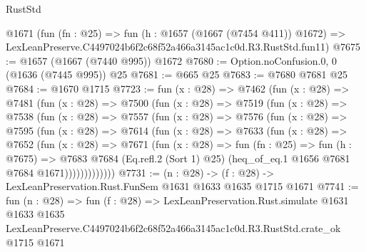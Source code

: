 \begin{lexlean}{RustStd}
\begin{coremodule}
    @1671
    (fun (fn : @25) =>
    fun (h : @1657 (@1667 (@7454 @411)) @1672) =>
    LexLeanPreserve.C4497024b6f2c68f52a466a3145ac1c0d.R3.RustStd.fun11)
@7675 := @1657 (@1667 (@7440 @995)) @1672
@7680 := Option.noConfusion.{0, 0} (@1636 (@7445 @995)) @25
@7681 := @665 @25
@7683 := @7680 @7681 @25
@7684 := @1670 @1715
@7723 := fun (x : @28) =>
  @7462
    (fun (x : @28) =>
    @7481
      (fun (x : @28) =>
      @7500
        (fun (x : @28) =>
        @7519
          (fun (x : @28) =>
          @7538
            (fun (x : @28) =>
            @7557
              (fun (x : @28) =>
              @7576
                (fun (x : @28) =>
                @7595
                  (fun (x : @28) =>
                  @7614
                    (fun (x : @28) =>
                    @7633
                      (fun (x : @28) =>
                      @7652
                        (fun (x : @28) =>
                        @7671
                          (fun (x : @28) =>
                          fun (fn : @25) =>
                          fun (h : @7675) =>
                          @7683
                            @7684
                            (Eq.refl.{2} (Sort 1) @25)
                            (heq_of_eq.{1} @1656 @7681 @7684 @1671)))))))))))))
@7731 := (n : @28) -> (f : @28) -> LexLeanPreservation.Rust.FunSem @1631 @1633 @1635 @1715 @1671
@7741 := fun (n : @28) =>
  fun (f : @28) =>
  LexLeanPreservation.Rust.simulate
    @1631
    @1633
    @1635
    LexLeanPreserve.C4497024b6f2c68f52a466a3145ac1c0d.R3.RustStd.crate_ok
    @1715
    @1671
\end{coremodule}
\end{lexlean}
